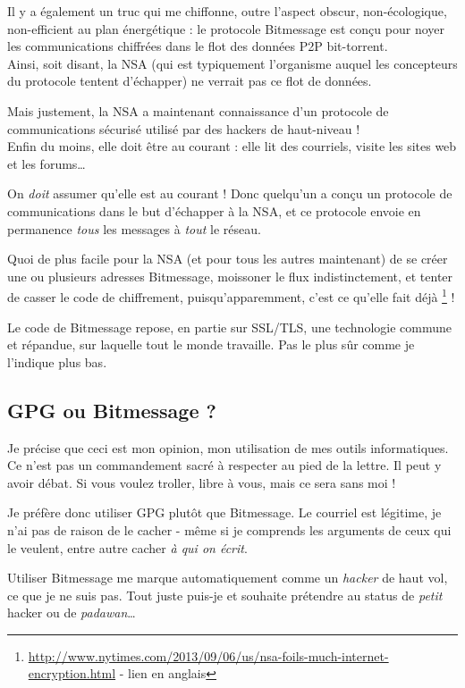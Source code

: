 Il y a également un truc qui me chiffonne, outre l'aspect obscur, non-écologique, non-efficient au plan énergétique : le protocole
Bitmessage est conçu pour noyer les communications chiffrées dans le flot des données P2P bit-torrent.\\Ainsi, soit disant, la NSA (qui est
typiquement l'organisme auquel les concepteurs du protocole tentent d'échapper) ne verrait pas ce flot de données.

Mais justement, la NSA a maintenant connaissance d'un protocole de communications sécurisé utilisé par des hackers de haut-niveau !\\Enfin
du moins, elle doit être au courant : elle lit des courriels, visite les sites web et les forums\ldots{}

On \emph{doit} assumer qu'elle est au courant ! Donc quelqu'un a conçu
un protocole de communications dans le but d'échapper à la NSA, et ce
protocole envoie en permanence \emph{tous} les messages à \emph{tout} le
réseau.

Quoi de plus facile pour la NSA (et pour tous les autres maintenant) de
se créer une ou plusieurs adresses Bitmessage, moissoner le flux
indistinctement, et tenter de casser le code de chiffrement,
puisqu'apparemment, c'est ce qu'elle fait déjà \footnote{\url{http://www.nytimes.com/2013/09/06/us/nsa-foils-much-internet-encryption.html} - lien en anglais} !

Le code de Bitmessage repose, en partie sur SSL/TLS, une technologie commune et répandue, sur laquelle tout le monde travaille. Pas le plus
sûr comme je l'indique plus bas.

\subsection{GPG ou Bitmessage ?}\label{gpg-ou-bitmessage}

\begin{notice}
Je précise que ceci est mon opinion, mon utilisation de mes outils informatiques. Ce n'est pas un commandement sacré à respecter au pied de
la lettre. Il peut y avoir débat. Si vous voulez troller, libre à vous, mais ce sera sans moi !
\end{notice}

Je préfère donc utiliser GPG plutôt que Bitmessage. Le courriel est
légitime, je n'ai pas de raison de le cacher - même si je comprends les
arguments de ceux qui le veulent, entre autre cacher \emph{à qui on écrit}.

Utiliser Bitmessage me marque automatiquement comme un \emph{hacker} de
haut vol, ce que je ne suis pas. Tout juste puis-je et souhaite
prétendre au status de \emph{petit} hacker ou de \emph{padawan}\ldots{}


